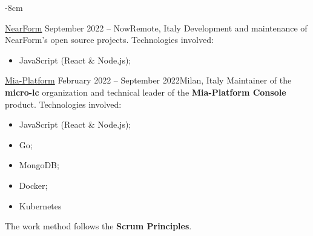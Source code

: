 \documentclass[10pt,a4paper]{altacv}
\begin{document}


\begin{adjustwidth}{}{-8cm}
\makecvheader
\end{adjustwidth}


{\href{https://www.nearform.com/}{NearForm}}
{September 2022 -- Now}{Remote, Italy}
Development and maintenance of NearForm's open source projects.
\newline\newline
Technologies involved:
\begin{itemize}
	\item JavaScript (React \& Node.js);
\end{itemize}

\divider

{\href{https://mia-platform.eu/}{Mia-Platform}}
{February 2022 -- September 2022}{Milan, Italy}
Maintainer of the \textbf{micro-lc} organization and technical leader of the \textbf{Mia-Platform Console} product.
\newline\newline
Technologies involved:
\begin{itemize}
	\item JavaScript (React \& Node.js);
	\item Go;
	\item MongoDB;
	\item Docker;
	\item Kubernetes
\end{itemize}

The work method follows the \textbf{Scrum Principles}.
\divider
\end{document}
